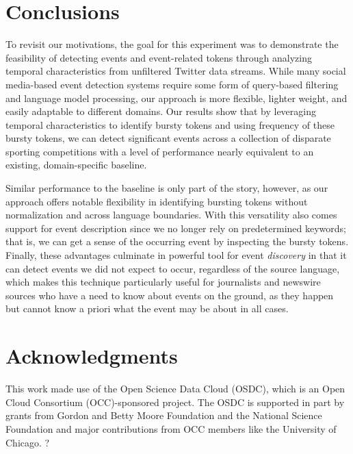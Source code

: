 \documentclass{acm_proc_article-sp}
\begin{document}
\section{Conclusions}

To revisit our motivations, the goal for this experiment was to demonstrate the feasibility of detecting events and event-related tokens through analyzing temporal characteristics from unfiltered Twitter data streams.
While many social media-based event detection systems require some form of query-based filtering and language model processing, our approach is more flexible, lighter weight, and easily adaptable to different domains.
Our results show that by leveraging temporal characteristics to identify bursty tokens and using frequency of these bursty tokens, we can detect significant events across a collection of disparate sporting competitions with a level of performance nearly equivalent to an existing, domain-specific baseline.

Similar performance to the baseline is only part of the story, however, as our approach offers notable flexibility in identifying bursting tokens without normalization and across language boundaries.
With this versatility also comes support for event description since we no longer rely on predetermined keywords; that is, we can get a sense of the occurring event by inspecting the bursty tokens.
Finally, these advantages culminate in powerful tool for event \emph{discovery} in that it can detect events we did not expect to occur, regardless of the source language, which makes this technique particularly useful for journalists and newswire sources who have a need to know about events on the ground, as they happen but cannot know a priori what the event may be about in all cases.


\section{Acknowledgments}
This work made use of the Open Science Data Cloud (OSDC), which is an Open Cloud Consortium (OCC)-sponsored project. 
The OSDC is supported in part by grants from Gordon and Betty Moore Foundation and the National Science Foundation and major contributions from OCC members like the University of Chicago. 
?

%

%
%
\end{document}
